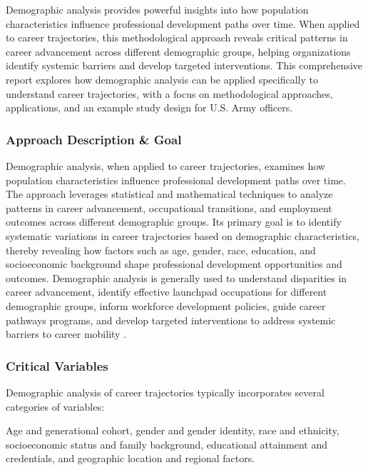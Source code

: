 \documentclass[../main.tex]{subfiles}
\begin{document}
Demographic analysis provides powerful insights into how population characteristics influence professional development paths over time. When applied to career trajectories, this methodological approach reveals critical patterns in career advancement across different demographic groups, helping organizations identify systemic barriers and develop targeted interventions. This comprehensive report explores how demographic analysis can be applied specifically to understand career trajectories, with a focus on methodological approaches, applications, and an example study design for U.S. Army officers.

\subsubsection{Approach Description \& Goal}

Demographic analysis, when applied to career trajectories, examines how population characteristics influence professional development paths over time. The approach leverages statistical and mathematical techniques to analyze patterns in career advancement, occupational transitions, and employment outcomes across different demographic groups. Its primary goal is to identify systematic variations in career trajectories based on demographic characteristics, thereby revealing how factors such as age, gender, race, education, and socioeconomic background shape professional development opportunities and outcomes. Demographic analysis is generally used to understand disparities in career advancement, identify effective launchpad occupations for different demographic groups, inform workforce development policies, guide career pathways programs, and develop targeted interventions to address systemic barriers to career mobility \citep{dol2023building, nataraj2018career}.

\subsubsection{Critical Variables}

Demographic analysis of career trajectories typically incorporates several categories of variables:


Age and generational cohort, gender and gender identity, race and ethnicity, socioeconomic status and family background, educational attainment and credentials, and geographic location and regional factors.
\end{document}
